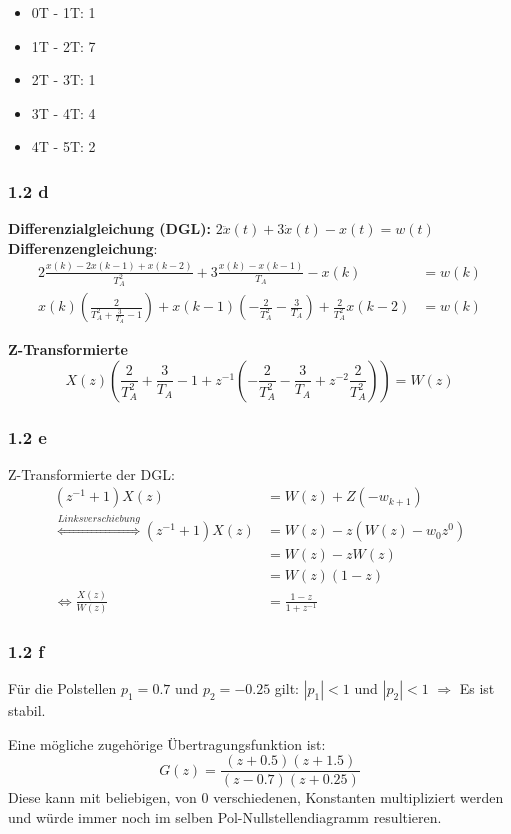 \documentclass[a4paper]{scrartcl}
\begin{document}
  \begin{itemize}
      \item 0T - 1T: 1
      \item 1T - 2T: 7
      \item 2T - 3T: 1
      \item 3T - 4T: 4
      \item 4T - 5T: 2
  \end{itemize}


  \subsubsection*{1.2 d}
  \textbf{Differenzialgleichung (DGL):} $2 \ddot{x}(t) + 3 \dot{x}(t) - x(t) = w(t)$\\
  \textbf{Differenzengleichung}:
  \begin{align}
      2 \frac{x(k) - 2x(k-1) + x(k-2)}{T_A^2} + 3 \frac{x(k) - x(k-1)}{T_A} - x(k) &= w(k)\\
      x(k) (\frac{2}{T_A^2 + \frac{3}{T_A} - 1}) + x(k-1)(-\frac{2}{T_A^2} - \frac{3}{T_A}) + \frac{2}{T_A^2} x(k-2) &= w(k)
  \end{align}

  \textbf{Z-Transformierte}
  \[X(z) (\frac{2}{T_A^2} + \frac{3}{T_A} - 1 + z^{-1} (- \frac{2}{T_A^2} - \frac{3}{T_A} + z^{-2} \frac{2}{T_A^2})) = W(z)\]

  \subsubsection*{1.2 e}
  Z-Transformierte der DGL:
  \begin{align}
      (z^{-1} + 1) X(z) &= W(z) + Z(-w_{k+1})\\
      \overset{Linksverschiebung}{\Leftrightarrow} (z^{-1} + 1) X(z) &= W(z) - z(W(z) - w_0 z^0)\\
      &= W(z)- z W(z)\\
      &= W(z) (1-z)\\
      \Leftrightarrow \frac{X(z)}{W(z)} &= \frac{1-z}{1+z^{-1}}
  \end{align}

  \subsubsection*{1.2 f}
  Für die Polstellen $p_1 = 0.7$ und $p_2 = -0.25$ gilt: $|p_1| < 1$ und $|p_2| < 1$
  $\Rightarrow$ Es ist stabil.

  Eine mögliche zugehörige Übertragungsfunktion ist:
  \[G(z) = \frac{(z+0.5)(z+1.5)}{(z-0.7) (z+0.25)}\]
  Diese kann mit beliebigen, von 0 verschiedenen, Konstanten multipliziert
  werden und würde immer noch im selben Pol-Nullstellendiagramm resultieren.
\end{document}
